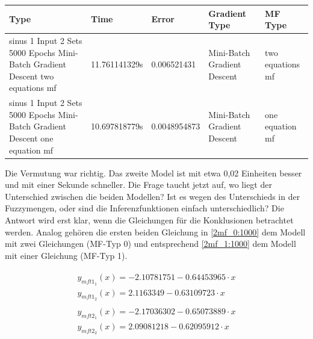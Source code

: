 {\begin{center}
	\begin{minipage}{\textwidth}
	\begin{tabular}{ | p{3cm} | l | l | p{3cm} | p{3cm} |}
		\hline
		Type & Time & Error & Gradient Type & MF Type \\ \hline
		sinus 1 Input 2 Sets 5000 Epochs Mini-Batch Gradient Descent two equations mf&11.761141329s&0.006521431&Mini-Batch Gradient Descent&two equations mf \\ \hline
		sinus 1 Input 2 Sets 5000 Epochs Mini-Batch Gradient Descent one equation mf&10.697818779s&0.0048954873&Mini-Batch Gradient Descent&one equation mf \\ \hline 
	\end{tabular}
\label{tab2_1000MB}
\end{minipage}
\end{center}

Die Vermutung war richtig. Das zweite Model ist mit etwa 0,02 Einheiten besser und mit einer Sekunde schneller. Die Frage taucht jetzt auf, wo liegt der Unterschied zwischen die beiden Modellen? Ist es wegen des Unterschieds in der Fuzzymengen, oder sind die Inferenzfunktionen einfach unterschiedlich? Die Antwort wird erst klar, wenn die Gleichungen für die Konklusionen betrachtet werden. Analog gehören die ersten beiden Gleichung in \ref{2mf_0:1000} dem Modell mit zwei Gleichungen (MF-Typ 0) und entsprechend \ref{2mf_1:1000} dem Modell mit einer Gleichung (MF-Typ 1).





\begin{align}
\begin{split}\label{2mf_0:1000}
y_{mft1_1}(x) = -2.10781751 - 0.64453965\cdot x \\
y_{mft1_2}(x) = 2.1163349 - 0.63109723\cdot x
\end{split} \\	
\begin{split}\label{2mf_1:1000}
y_{mft2_1}(x) = -2.17036302 - 0.65073889\cdot x \\
y_{mft2_2}(x) = 2.09081218 - 0.62095912\cdot x
\end{split}	
\end{align}

}
